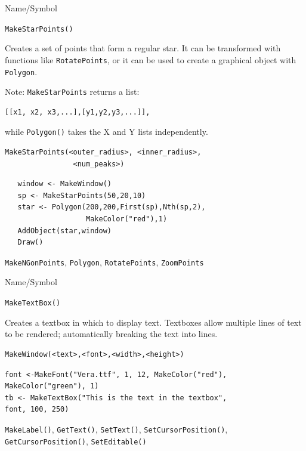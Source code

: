 \begin{desc}{Name/Symbol}
\item[Name/Symbol]	\verb+MakeStarPoints()+

\item[Description] 
Creates a set of points that form a regular star.  It can be
transformed with functions like \verb+RotatePoints+, or it can be 
used to create a graphical object with \verb+Polygon+.

Note: \verb+MakeStarPoints+ returns a list:
\begin{verbatim}
[[x1, x2, x3,...],[y1,y2,y3,...]],
\end{verbatim}
while \verb+Polygon()+ takes the X and Y lists independently.

\item[Usage]
\begin{verbatim}
MakeStarPoints(<outer_radius>, <inner_radius>,
                <num_peaks>)
\end{verbatim}

\item[Example]	
\begin{verbatim}
   window <- MakeWindow()
   sp <- MakeStarPoints(50,20,10)
   star <- Polygon(200,200,First(sp),Nth(sp,2),
                   MakeColor("red"),1)
   AddObject(star,window)
   Draw()
\end{verbatim}

\item[See Also]	
\verb+MakeNGonPoints+, \verb+Polygon+, \verb+RotatePoints+, \verb+ZoomPoints+
\end{desc}


\begin{desc}{Name/Symbol}
\item[Name/Symbol]	\verb+MakeTextBox()+

\item[Description]	Creates a textbox in which to display text. 
		Textboxes allow multiple lines of text to be rendered;
		automatically breaking the text into lines. 

\item[Usage]
\begin{verbatim}
MakeWindow(<text>,<font>,<width>,<height>)
\end{verbatim}

\item[Example]	
\begin{verbatim}
font <-MakeFont("Vera.ttf", 1, 12, MakeColor("red"), 
MakeColor("green"), 1)
tb <- MakeTextBox("This is the text in the textbox", 
font, 100, 250)
\end{verbatim}

\item[See Also]	\verb+MakeLabel()+, \verb+GetText()+, \verb+SetText()+, \verb+SetCursorPosition()+,
		\verb+GetCursorPosition()+, \verb+SetEditable()+
\end{desc}

